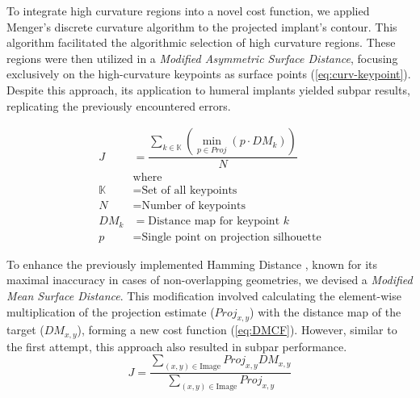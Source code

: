 To integrate high curvature regions into a novel cost function, we applied Menger’s discrete curvature algorithm \cite{legerMengerCurvatureRectifiability1999} to the projected implant's contour.
This algorithm facilitated the algorithmic selection of high curvature regions.
These regions were then utilized in a \emph{Modified Asymmetric Surface Distance}, focusing exclusively on the high-curvature keypoints as surface points (\cref{eq:curv-keypoint}).
Despite this approach, its application to humeral implants yielded subpar results, replicating the previously encountered errors.

\begin{equation}
	\label{eq:curv-keypoint}
	\begin{split}
		\displaystyle J & = \dfrac{\sum_{k \in \mathbb{K}}(\min_{p\in Proj}(p \cdot DM_{k}))}{N} \\
		                & \text{where}                                                           \\
		\mathbb{K}      & = \text{Set of all keypoints}                                          \\
		N               & = \text{Number of keypoints}                                           \\
		DM_{k}          & = \text{Distance map for keypoint $k$}                                 \\
		p               & = \text{Single point on projection silhouette}
	\end{split}
\end{equation}

To enhance the previously implemented Hamming Distance \cite{floodAutomatedRegistration3D2018,jensenJointTrackMachine2023}, known for its maximal inaccuracy in cases of non-overlapping geometries, we devised a \emph{Modified Mean Surface Distance}.
This modification involved calculating the element-wise multiplication of the projection estimate ($Proj_{x,y}$) with the distance map of the target ($DM_{x,y}$), forming a new cost function (\cref{eq:DMCF}).
However, similar to the first attempt, this approach also resulted in subpar performance.
\begin{equation}
	\label{eq:DMCF}
	J = \dfrac{ \sum_{(x,y) \in \text{Image}} Proj_{x,y}DM_{x,y} }{\sum_{(x,y)\in \text{Image}}Proj_{x,y}}
\end{equation}


